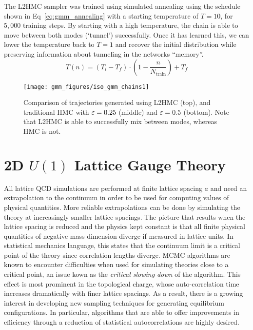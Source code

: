 \documentclass[../main.tex]{subfiles}
\begin{document}
%
The L2HMC sampler was trained using simulated annealing using the schedule shown in Eq~\ref{eq:gmm_annealing} with a
starting temperature of $T = 10$, for $5,000$ training steps.
%
By starting with a high temperature, the chain is able to move between both modes (`tunnel') successfully.
%
Once it has learned this, we can lower the temperature back to $T = 1$ and recover the initial distribution while
preserving information about tunneling in the networks ``memory''.
%
\begin{equation}
  T(n) = {\left(T_{i} - T_{f}\right)} \cdot {\left(1 - \frac{n}{N_{\mathrm{train}}}\right)} + T_{f}
  \label{eq:gmm_annealing}
\end{equation}
%
\begin{figure}[htbp]
    \centering
    \texttt{[image: gmm\_figures/iso\_gmm\_chains1]}
    \caption{Comparison of trajectories generated using L2HMC (top), and
        traditional HMC with ${\varepsilon} = 0.25$ (middle) and ${\varepsilon} = 0.5$ (bottom).
        Note that L2HMC is able to successfully mix between modes, whereas HMC
        is not.}\label{fig:trajectories}
\end{figure}
%
\section{2D \texorpdfstring{$U(1)$}{U (1)} Lattice Gauge Theory}%
\label{sec:l2hmc_u1}
All lattice QCD simulations are performed at finite lattice spacing $a$ and need an extrapolation to the continuum in
order to be used for computing values of physical quantities.
%
More reliable extrapolations can be done by simulating the theory at increasingly smaller lattice spacings.
%
The picture that results when the lattice spacing is reduced and the physics kept constant is that all finite physical
quantities of negative mass dimension diverge if measured in lattice units.
%
In statistical mechanics language, this states that the continuum limit is a critical point of the theory since
correlation lengths diverge.
%
MCMC algorithms are known to encounter difficulties when used for simulating theories close to a critical point, an
issue kown as the \emph{critical slowing down} of the algorithm.
%
This effect is most prominent in the topological charge, whose auto-correlation time increases dramatically with finer
lattice spacings.
%
As a result, there is a growing interest in developing new sampling techniques for generating equilibrium
configurations. 
%
In particular, algorithms that are able to offer improvements in efficiency through a reduction of statistical
autocorrelations are highly desired. 
%
\end{document}
